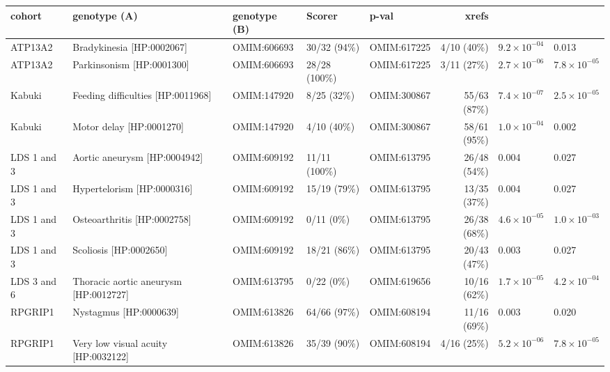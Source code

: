 \clearpage
\newpage


\clearpage
\newpage


\begin{table}
\centering
\begin{tabular}{l>{\raggedright\arraybackslash}p{2.5cm}>{\raggedright\arraybackslash}p{2.5cm}>{\raggedright}p{4cm}lr}
\toprule
\textbf{cohort} & \textbf{genotype (A)} & \textbf{genotype (B)} & \textbf{Scorer} & \textbf{p-val} & \textbf{xrefs}\\
\midrule
ATP13A2 & Bradykinesia [HP:0002067] & OMIM:606693 & 30/32 (94\%) & OMIM:617225 & 4/10 (40\%) & $9.2 \times 10^{-04}$ & 0.013\\
ATP13A2 & Parkinsonism [HP:0001300] & OMIM:606693 & 28/28 (100\%) & OMIM:617225 & 3/11 (27\%) & $2.7 \times 10^{-06}$ & $7.8 \times 10^{-05}$\\
Kabuki & Feeding difficulties [HP:0011968] & OMIM:147920 & 8/25 (32\%) & OMIM:300867 & 55/63 (87\%) & $7.4 \times 10^{-07}$ & $2.5 \times 10^{-05}$\\
Kabuki & Motor delay [HP:0001270] & OMIM:147920 & 4/10 (40\%) & OMIM:300867 & 58/61 (95\%) & $1.0 \times 10^{-04}$ & 0.002\\
LDS 1 and 3 & Aortic aneurysm [HP:0004942] & OMIM:609192 & 11/11 (100\%) & OMIM:613795 & 26/48 (54\%) & 0.004 & 0.027\\
LDS 1 and 3 & Hypertelorism [HP:0000316] & OMIM:609192 & 15/19 (79\%) & OMIM:613795 & 13/35 (37\%) & 0.004 & 0.027\\
LDS 1 and 3 & Osteoarthritis [HP:0002758] & OMIM:609192 & 0/11 (0\%) & OMIM:613795 & 26/38 (68\%) & $4.6 \times 10^{-05}$ & $1.0 \times 10^{-03}$\\
LDS 1 and 3 & Scoliosis [HP:0002650] & OMIM:609192 & 18/21 (86\%) & OMIM:613795 & 20/43 (47\%) & 0.003 & 0.027\\
LDS 3 and 6 & Thoracic aortic aneurysm [HP:0012727] & OMIM:613795 & 0/22 (0\%) & OMIM:619656 & 10/16 (62\%) & $1.7 \times 10^{-05}$ & $4.2 \times 10^{-04}$\\
RPGRIP1 & Nystagmus [HP:0000639] & OMIM:613826 & 64/66 (97\%) & OMIM:608194 & 11/16 (69\%) & 0.003 & 0.020\\
RPGRIP1 & Very low visual acuity [HP:0032122] & OMIM:613826 & 35/39 (90\%) & OMIM:608194 & 4/16 (25\%) & $5.2 \times 10^{-06}$ & $7.8 \times 10^{-05}$\\

\end{tabular}
\end{table}
